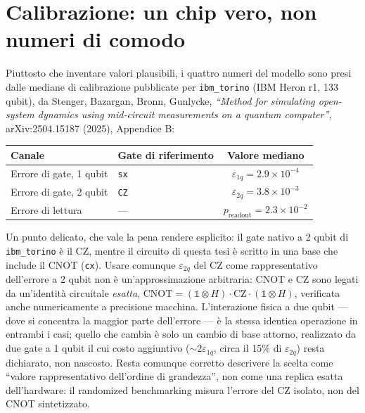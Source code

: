 \documentclass[11pt,a4paper]{article}
\begin{document}
\section{Calibrazione: un chip vero, non numeri di comodo}

Piuttosto che inventare valori plausibili, i quattro numeri del modello sono
presi dalle mediane di calibrazione pubblicate per \texttt{ibm\_torino} (IBM
Heron r1, 133 qubit), da Stenger, Bazargan, Bronn, Gunlycke,
\emph{``Method for simulating open-system dynamics using mid-circuit
measurements on a quantum computer''}, arXiv:2504.15187 (2025), Appendice B:

\begin{center}
\renewcommand{\arraystretch}{1.3}
\begin{tabular}{@{}llc@{}}
\toprule
\textbf{Canale} & \textbf{Gate di riferimento} & \textbf{Valore mediano}\\
\midrule
Errore di gate, 1 qubit & \texttt{sx} & $\varepsilon_{1q}=2.9\times10^{-4}$\\
Errore di gate, 2 qubit & \texttt{CZ} & $\varepsilon_{2q}=3.8\times10^{-3}$\\
Errore di lettura & --- & $p_\text{readout}=2.3\times10^{-2}$\\
\bottomrule
\end{tabular}
\end{center}

Un punto delicato, che vale la pena rendere esplicito: il gate nativo a 2
qubit di \texttt{ibm\_torino} è il CZ, mentre il circuito di questa tesi è
scritto in una base che include il CNOT (\texttt{cx}). Usare comunque
$\varepsilon_{2q}$ del CZ come rappresentativo dell'errore a 2 qubit non è
un'approssimazione arbitraria: CNOT e CZ sono legati da un'identità
circuitale \emph{esatta}, $\text{CNOT}=(\mathbb 1\otimes H)\cdot
\text{CZ}\cdot(\mathbb 1\otimes H)$, verificata anche numericamente a
precisione macchina. L'interazione fisica a due qubit --- dove si concentra
la maggior parte dell'errore --- è la stessa identica operazione in entrambi i
casi; quello che cambia è solo un cambio di base attorno, realizzato da due
gate a 1 qubit il cui costo aggiuntivo ($\sim2\varepsilon_{1q}$, circa il
15\% di $\varepsilon_{2q}$) resta dichiarato, non nascosto. Resta comunque
corretto descrivere la scelta come ``valore rappresentativo dell'ordine di
grandezza'', non come una replica esatta dell'hardware: il randomized
benchmarking misura l'errore del CZ isolato, non del CNOT sintetizzato.

\end{document}
